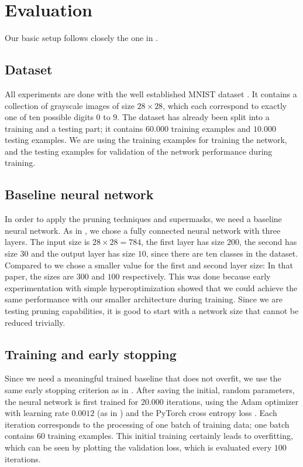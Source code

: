 \documentclass[12pt,final,twoside]{article}
\theoremstyle{plain}
\theoremstyle{definition}
\theoremstyle{remark}
\theoremstyle{named}
\begin{document}
\section{Evaluation}

Our basic setup follows closely the one in \cite{supermask}. 

\subsection{Dataset}

All experiments are done with the well established MNIST dataset \cite{mnist}. It contains a collection of grayscale images of size $28 \times 28$, which each correspond to exactly one of ten possible digits $0$ to $9$. The dataset has already been split into a training and a testing part; it contains $60.000$ training examples and $10.000$ testing examples. We are using the training examples for training the network, and the testing examples for validation of the network performance during training.

\subsection{Baseline neural network}

In order to apply the pruning techniques and supermasks, we need a baseline neural network. As in \cite{supermask}, we chose a fully connected neural network with three layers. The input size is $28 \times 28 = 784$, the first layer has size $200$, the second has size $30$ and the output layer has size $10$, since there are ten classes in the dataset. Compared to \cite{supermask} we chose a smaller value for the first and second layer size: In that paper, the sizes are $300$ and $100$ respectively. This was done because early experimentation with simple hyperoptimization showed that we could achieve the same performance with our smaller architecture during training. Since we are testing pruning capabilities, it is good to start with a network size that cannot be reduced trivially.


\subsection{Training and early stopping}

Since we need a meaningful trained baseline that does not overfit, we use the same early stopping criterion as in \cite{supermask}. After saving the initial, random parameters, the neural network is first trained for $20.000$ iterations, using the Adam optimizer \cite{adam} with learning rate $0.0012$ (as in \cite{supermask}) and the PyTorch cross entropy loss \cite{pytorch}. Each iteration corresponds to the processing of one batch of training data; one batch contains $60$ training examples. This initial training certainly leads to overfitting, which can be seen by plotting the validation loss, which is evaluated every $100$ iterations.
\end{document}
